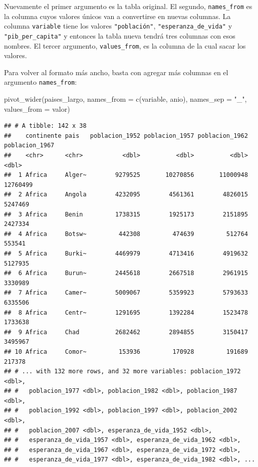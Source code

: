 \documentclass[
  openany]{book}
\newenvironment{Shaded}{\begin{snugshade}}{\end{snugshade}}
\newcommand{\AttributeTok}[1]{\textcolor[rgb]{0.77,0.63,0.00}{#1}}
\newcommand{\FunctionTok}[1]{\textcolor[rgb]{0.00,0.00,0.00}{#1}}
\newcommand{\NormalTok}[1]{#1}
\newcommand{\StringTok}[1]{\textcolor[rgb]{0.31,0.60,0.02}{#1}}
\begin{document}
Nuevamente el primer argumento es la tabla original.
El segundo, \texttt{names\_from} es la columna cuyos valores únicos van a convertirse en nuevas columnas.
La columna \texttt{variable} tiene los valores \texttt{"población"}, \texttt{"esperanza\_de\_vida"} y \texttt{"pib\_per\_capita"} y entonces la tabla nueva tendrá tres columnas con esos nombres.
El tercer argumento, \texttt{values\_from}, es la columna de la cual sacar los valores.

Para volver al formato más ancho, basta con agregar más columnas en el argumento \texttt{names\_from}:

\begin{Shaded}
\begin{Highlighting}[]
\FunctionTok{pivot\_wider}\NormalTok{(paises\_largo, }
            \AttributeTok{names\_from =} \FunctionTok{c}\NormalTok{(variable, anio), }
            \AttributeTok{names\_sep =} \StringTok{"\_"}\NormalTok{,}
            \AttributeTok{values\_from =}\NormalTok{ valor)}
\end{Highlighting}
\end{Shaded}

\begin{verbatim}
## # A tibble: 142 x 38
##    continente pais   poblacion_1952 poblacion_1957 poblacion_1962 poblacion_1967
##    <chr>      <chr>           <dbl>          <dbl>          <dbl>          <dbl>
##  1 Africa     Alger~        9279525       10270856       11000948       12760499
##  2 Africa     Angola        4232095        4561361        4826015        5247469
##  3 Africa     Benin         1738315        1925173        2151895        2427334
##  4 Africa     Botsw~         442308         474639         512764         553541
##  5 Africa     Burki~        4469979        4713416        4919632        5127935
##  6 Africa     Burun~        2445618        2667518        2961915        3330989
##  7 Africa     Camer~        5009067        5359923        5793633        6335506
##  8 Africa     Centr~        1291695        1392284        1523478        1733638
##  9 Africa     Chad          2682462        2894855        3150417        3495967
## 10 Africa     Comor~         153936         170928         191689         217378
## # ... with 132 more rows, and 32 more variables: poblacion_1972 <dbl>,
## #   poblacion_1977 <dbl>, poblacion_1982 <dbl>, poblacion_1987 <dbl>,
## #   poblacion_1992 <dbl>, poblacion_1997 <dbl>, poblacion_2002 <dbl>,
## #   poblacion_2007 <dbl>, esperanza_de_vida_1952 <dbl>,
## #   esperanza_de_vida_1957 <dbl>, esperanza_de_vida_1962 <dbl>,
## #   esperanza_de_vida_1967 <dbl>, esperanza_de_vida_1972 <dbl>,
## #   esperanza_de_vida_1977 <dbl>, esperanza_de_vida_1982 <dbl>, ...
\end{verbatim}
\end{document}
